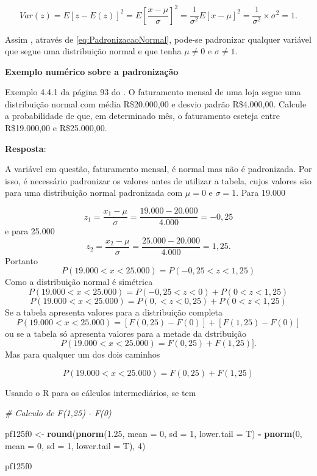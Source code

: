 \documentclass[
]{book}
\newenvironment{Shaded}{\begin{snugshade}}{\end{snugshade}}
\newcommand{\CommentTok}[1]{\textcolor[rgb]{0.56,0.35,0.01}{\textit{#1}}}
\newcommand{\DataTypeTok}[1]{\textcolor[rgb]{0.13,0.29,0.53}{#1}}
\newcommand{\DecValTok}[1]{\textcolor[rgb]{0.00,0.00,0.81}{#1}}
\newcommand{\FloatTok}[1]{\textcolor[rgb]{0.00,0.00,0.81}{#1}}
\newcommand{\KeywordTok}[1]{\textcolor[rgb]{0.13,0.29,0.53}{\textbf{#1}}}
\newcommand{\NormalTok}[1]{#1}
\newcommand{\OperatorTok}[1]{\textcolor[rgb]{0.81,0.36,0.00}{\textbf{#1}}}
\newcommand{\StringTok}[1]{\textcolor[rgb]{0.31,0.60,0.02}{#1}}
\begin{document}
\[
  Var(z) = E[z - E(z)]^2 = E\left[\dfrac{x-\mu}{\sigma}\right]^2 =
  \dfrac{1}{\sigma^2} E[x - \mu]^2 = \dfrac{1}{\sigma^2}\times \sigma^2 = 1.
\]

Assim , através de \eqref{eq:PadronizacaoNormal}, pode-se padronizar qualquer variável que segue uma distribuição normal e que tenha \(\mu\neq 0\) e \(\sigma \neq 1\).

\textbf{Exemplo numérico sobre a padronização}

Exemplo 4.4.1 da página 93 do \citet{Sartoris2013}. O faturamento mensal de uma loja segue uma distribuição normal com média R\$20.000,00 e desvio padrão R\$4.000,00. Calcule a probabilidade de que, em determinado mês, o faturamento eseteja entre R\$19.000,00 e R\$25.000,00.

\textbf{Resposta}:

A variável em questão, faturamento mensal, é normal mas não é padronizada. Por isso, é necessário padronizar os valores antes de utilizar a tabela, cujos valores são para uma distribuição normal padronizada com \(\mu=0\) e \(\sigma =1\).
Para 19.000

\[
  z_1 = \dfrac{x_1 -\mu}{\sigma} = \dfrac{19.000 - 20.000}{4.000} = -0,25
\]
e para 25.000
\[
  z_2 = \dfrac{x_2 - \mu}{\sigma} = \dfrac{25.000-20.000}{4.000} = 1,25.
\]
Portanto
\[
  P(19.000 < x <25.000) = P(-0,25 < z < 1,25)
\]
Como a distribuição normal é simétrica
\[
  P(19.000 < x <25.000) = P(-0,25 < z < 0) + P(0 < z < 1,25)
\]
\[
  P(19.000 < x <25.000) = P(0,< z < 0,25) + P(0 < z < 1,25)
\]
Se a tabela apresenta valores para a distribuição completa
\[
  P(19.000 < x <25.000) = [F(0,25) - F(0)]  + [F(1,25) - F(0)]
\]
ou se a tabela só apresenta valores para a metade da dstribuição
\[
  P(19.000 < x <25.000) = F(0,25)  + F(1,25)].
\]
Mas para qualquer um dos dois caminhos

\[
  P(19.000 < x <25.000) = F(0,25)  +  F(1,25)
\]

Usando o R para os cálculos intermediários, se tem

\begin{Shaded}
\begin{Highlighting}[]
\CommentTok{# Calculo de F(1,25) - F(0)}

\NormalTok{pf125f0 <-}\StringTok{ }\KeywordTok{round}\NormalTok{(}\KeywordTok{pnorm}\NormalTok{(}\FloatTok{1.25}\NormalTok{, }\DataTypeTok{mean =} \DecValTok{0}\NormalTok{, }\DataTypeTok{sd =} \DecValTok{1}\NormalTok{, }\DataTypeTok{lower.tail =}\NormalTok{ T) }\OperatorTok{-}\StringTok{ }
\StringTok{    }\KeywordTok{pnorm}\NormalTok{(}\DecValTok{0}\NormalTok{, }\DataTypeTok{mean =} \DecValTok{0}\NormalTok{, }\DataTypeTok{sd =} \DecValTok{1}\NormalTok{, }\DataTypeTok{lower.tail =}\NormalTok{ T), }\DecValTok{4}\NormalTok{)}

\NormalTok{pf125f0}
\end{Highlighting}
\end{Shaded}
\end{document}

